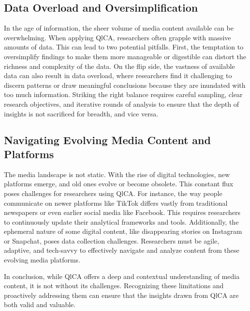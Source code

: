 \documentclass[
  b5paper]{book}
\begin{document}
\hypertarget{data-overload-and-oversimplification}{%
\subsection*{Data Overload and Oversimplification}\label{data-overload-and-oversimplification}}

In the age of information, the sheer volume of media content available can be overwhelming. When applying QlCA, researchers often grapple with massive amounts of data. This can lead to two potential pitfalls. First, the temptation to oversimplify findings to make them more manageable or digestible can distort the richness and complexity of the data. On the flip side, the vastness of available data can also result in data overload, where researchers find it challenging to discern patterns or draw meaningful conclusions because they are inundated with too much information. Striking the right balance requires careful sampling, clear research objectives, and iterative rounds of analysis to ensure that the depth of insights is not sacrificed for breadth, and vice versa.

\hypertarget{navigating-evolving-media-content-and-platforms}{%
\subsection*{Navigating Evolving Media Content and Platforms}\label{navigating-evolving-media-content-and-platforms}}

The media landscape is not static. With the rise of digital technologies, new platforms emerge, and old ones evolve or become obsolete. This constant flux poses challenges for researchers using QlCA. For instance, the way people communicate on newer platforms like TikTok differs vastly from traditional newspapers or even earlier social media like Facebook. This requires researchers to continuously update their analytical frameworks and tools. Additionally, the ephemeral nature of some digital content, like disappearing stories on Instagram or Snapchat, poses data collection challenges. Researchers must be agile, adaptive, and tech-savvy to effectively navigate and analyze content from these evolving media platforms.

In conclusion, while QlCA offers a deep and contextual understanding of media content, it is not without its challenges. Recognizing these limitations and proactively addressing them can ensure that the insights drawn from QlCA are both valid and valuable.
\end{document}
